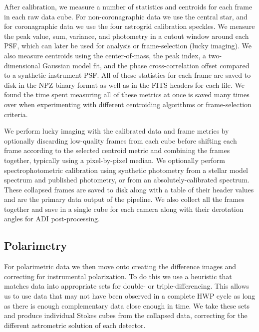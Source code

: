 After calibration, we measure a number of statistics and centroids for each frame in each raw data cube. For non-coronagraphic data we use the central star, and for coronagraphic data we use the four astrogrid calibration speckles. We measure the peak value, sum, variance, and photometry in a cutout window around each PSF, which can later be used for analysis or frame-selection (lucky imaging). We also measure centroids using the center-of-mass, the peak index, a two-dimensional Gaussian model fit, and the phase cross-correlation offset compared to a synthetic instrument PSF. All of these statistics for each frame are saved to disk in the NPZ binary format as well as in the FITS headers for each file. We found the time spent measuring all of these metrics at once is saved many times over when experimenting with different centroiding algorithms or frame-selection criteria.

We perform lucky imaging with the calibrated data and frame metrics by optionally discarding low-quality frames from each cube before shifting each frame according to the selected centroid metric and combining the frames together, typically using a pixel-by-pixel median. We optionally perform spectrophotometric calibration using synthetic photometry from a stellar model spectrum and published photometry, or from an absolutely-calibrated spectrum. These collapsed frames are saved to disk along with a table of their header values and are the primary data output of the pipeline. We also collect all the frames together and save in a single cube for each camera along with their derotation angles for ADI post-processing.

\subsection{Polarimetry}
For polarimetric data we then move onto creating the difference images and correcting for instrumental polarization. To do this we use a heuristic that matches data into appropriate sets for double- or triple-differencing. This allows us to use data that may not have been observed in a complete HWP cycle as long as there is enough complementary data close enough in time. We take these sets and produce individual Stokes cubes from the collapsed data, correcting for the different astrometric solution of each detector. 

